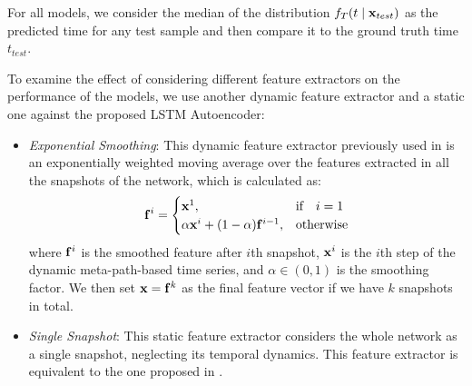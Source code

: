 For all models, we consider the median of the distribution $f_T(t\mid\mathbf{x}_{test})$ as the predicted time for any test sample and then compare it to the ground truth time $t_{test}$.

To examine the effect of considering different feature extractors on the performance of the models, we use another dynamic feature extractor and a static one against the proposed LSTM Autoencoder:
\begin{itemize}
\item \emph{Exponential Smoothing}: This dynamic feature extractor previously used in \cite{hajibagheri2016leveraging} is an exponentially weighted moving average over the features extracted in all the snapshots of the network, which is calculated as:
\[\mathbf{f}^i=\begin{cases} 
\mathbf{x}^1, & \text{if}\quad i=1 \\
\alpha\mathbf{x}^i+(1-\alpha)\mathbf{f}^{i-1}, & \text{otherwise}
\end{cases}\]
where $\mathbf{f}^i$ is the smoothed feature after $i$th snapshot, $\mathbf{x}^i$ is the $i$th step of the dynamic meta-path-based time series, and $\alpha\in(0,1)$ is the smoothing factor. We then set $\mathbf{x}=\mathbf{f}^k$ as the final feature vector if we have $k$ snapshots in total.
\item \emph{Single Snapshot}: This static feature extractor considers the whole network as a single snapshot, neglecting its temporal dynamics. This feature extractor is equivalent to the one proposed in \cite{sun2012will}.
\end{itemize}

